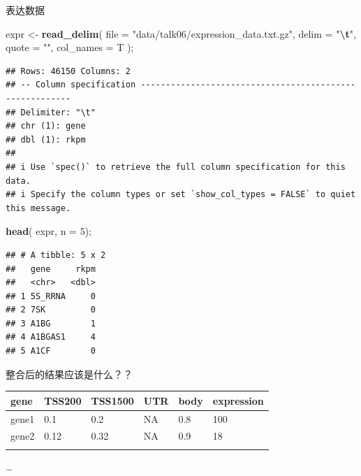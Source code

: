 \documentclass[ignorenonframetext,]{beamer}
\newenvironment{Shaded}{\begin{snugshade}}{\end{snugshade}}
\newcommand{\AttributeTok}[1]{\textcolor[rgb]{0.13,0.29,0.53}{#1}}
\newcommand{\DecValTok}[1]{\textcolor[rgb]{0.00,0.00,0.81}{#1}}
\newcommand{\FunctionTok}[1]{\textcolor[rgb]{0.13,0.29,0.53}{\textbf{#1}}}
\newcommand{\NormalTok}[1]{#1}
\newcommand{\OtherTok}[1]{\textcolor[rgb]{0.56,0.35,0.01}{#1}}
\newcommand{\SpecialCharTok}[1]{\textcolor[rgb]{0.81,0.36,0.00}{\textbf{#1}}}
\newcommand{\StringTok}[1]{\textcolor[rgb]{0.31,0.60,0.02}{#1}}
\newcommand\FontSmall{\fontsize{7}{8}\selectfont}
\begin{document}
\begin{frame}[fragile]{表达数据}
\protect\hypertarget{ux8868ux8fbeux6570ux636e}{}
\FontSmall

\begin{Shaded}
\begin{Highlighting}[]
\NormalTok{expr }\OtherTok{\textless{}{-}} \FunctionTok{read\_delim}\NormalTok{( }\AttributeTok{file =} \StringTok{"data/talk06/expression\_data.txt.gz"}\NormalTok{,}
                    \AttributeTok{delim =} \StringTok{"}\SpecialCharTok{\textbackslash{}t}\StringTok{"}\NormalTok{, }\AttributeTok{quote =} \StringTok{""}\NormalTok{, }\AttributeTok{col\_names =}\NormalTok{ T );}
\end{Highlighting}
\end{Shaded}

\begin{verbatim}
## Rows: 46150 Columns: 2
## -- Column specification --------------------------------------------------------
## Delimiter: "\t"
## chr (1): gene
## dbl (1): rkpm
## 
## i Use `spec()` to retrieve the full column specification for this data.
## i Specify the column types or set `show_col_types = FALSE` to quiet this message.
\end{verbatim}

\begin{Shaded}
\begin{Highlighting}[]
\FunctionTok{head}\NormalTok{( expr, }\AttributeTok{n =} \DecValTok{5}\NormalTok{);}
\end{Highlighting}
\end{Shaded}

\begin{verbatim}
## # A tibble: 5 x 2
##   gene     rkpm
##   <chr>   <dbl>
## 1 5S_RRNA     0
## 2 7SK         0
## 3 A1BG        1
## 4 A1BGAS1     4
## 5 A1CF        0
\end{verbatim}
\end{frame}

\begin{frame}{整合后的结果应该是什么？？}
\protect\hypertarget{ux6574ux5408ux540eux7684ux7ed3ux679cux5e94ux8be5ux662fux4ec0ux4e48}{}
\begin{longtable}[]{@{}llllll@{}}
\toprule\noalign{}
gene & TSS200 & TSS1500 & UTR & body & expression \\
\midrule\noalign{}
\endhead
gene1 & 0.1 & 0.2 & NA & 0.8 & 100 \\
gene2 & 0.12 & 0.32 & NA & 0.9 & 18 \\
\bottomrule\noalign{}
\end{longtable}

\ldots{}
\end{frame}
\end{document}
